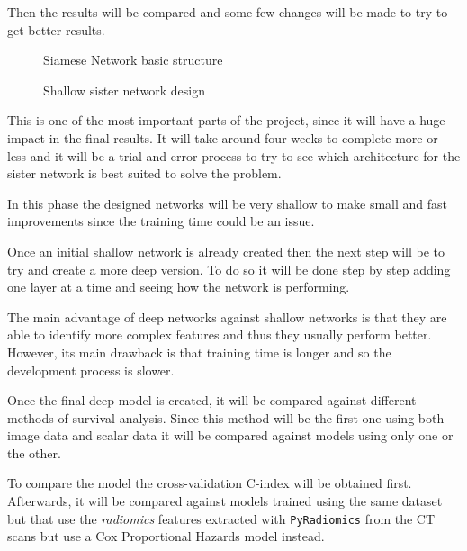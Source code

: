 Then the results will be compared and some few changes will be made to try to get better results.

\begin{figure}
  \centering
  
  \caption{Siamese Network basic structure \label{fig:siamese}}
\end{figure}

\begin{figure}
  \centering
  
  \caption{Shallow sister network design \label{fig:shallow-sister}}
\end{figure}

This is one of the most important parts of the project, since it will have a huge
impact in the final results. It will take around four weeks to complete more or less
and it will be a trial and error process to try to see which architecture for the sister
network is best suited to solve the problem.

In this phase the designed networks will be very shallow to make small and fast improvements
since the training time could be an issue.


Once an initial shallow network is already created then the next step will be to try 
and create a more deep version. To do so it will be done step by step adding one layer
at a time and seeing how the network is performing.

The main advantage of deep networks against shallow networks is that they are able to
identify more complex features and thus they usually perform better. However, its 
main drawback is that training time is longer and so the development process is 
slower.


Once the final deep model is created, it will be compared against different methods of 
survival analysis. Since this method will be the first one using both image data and scalar 
data it will be compared against models using only one or the other. 

To compare the model the cross-validation C-index will be obtained first. Afterwards,
it will be compared against models trained using the same dataset but that use the
\emph{radiomics} features extracted with \texttt{PyRadiomics} from the CT scans but 
use a Cox Proportional Hazards model instead.
~\cites{medical:py-radiomics}{medical:cox}

